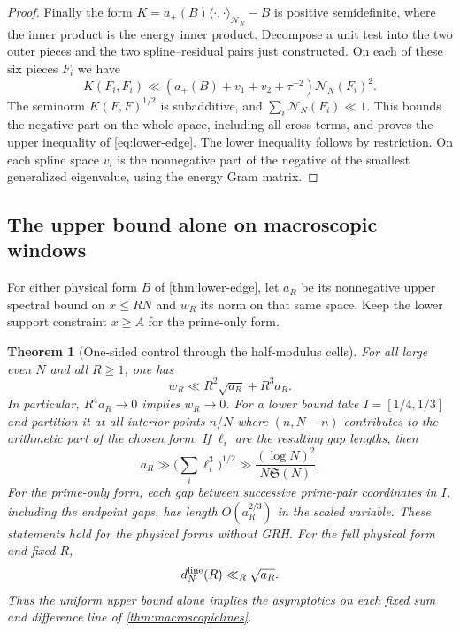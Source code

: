 \documentclass[11pt,a4paper]{article}
\numberwithin{equation}{section}
\newtheorem{theorem}{Theorem}[section]
\newcommand{\SSS}{\mathfrak S}
\newcommand{\NN}{\mathcal N_N}
\begin{document}
\begin{proof}
Finally the form $K=a_+(B)\langle\cdot,\cdot\rangle_{\NN}-B$
is positive semidefinite, where the inner product is the energy
inner product. Decompose a unit test into the two outer pieces
and the two spline--residual pairs just constructed. On each
of these six pieces $F_i$ we have
\[
 K(F_i,F_i)\ll
 (a_+(B)+v_1+v_2+\tau^{-2})\NN(F_i)^2 .
\]
The seminorm $K(F,F)^{1/2}$ is subadditive, and
$\sum_i\NN(F_i)\ll1$. This bounds the negative part on the
whole space, including all cross terms, and proves the upper
inequality of \cref{eq:lower-edge}. The lower inequality follows
by restriction. On each spline space $v_i$ is the nonnegative
part of the negative of the smallest generalized eigenvalue,
using the energy Gram matrix.
\end{proof}

\subsection{The upper bound alone on macroscopic windows}

For either physical form $B$ of \cref{thm:lower-edge}, let
$a_R$ be its nonnegative upper spectral bound on $x\le RN$
and $w_R$ its norm on that same space. Keep the lower support
constraint $x\ge A$ for the prime-only form.

\begin{theorem}[One-sided control through the half-modulus cells]
\label{thm:halfcell-upper}
For all large even $N$ and all $R\ge1$, one has
\begin{equation}
 w_R\ll R^2\sqrt{a_R}+R^3a_R .
 \label{eq:halfcell-upper}
\end{equation}
In particular, $R^4a_R\to0$ implies $w_R\to0$. For a lower bound
take $I=[1/4,1/3]$ and partition it at all interior points $n/N$
where $(n,N-n)$ contributes to the arithmetic part of the chosen
form. If $\ell_i$ are the resulting gap lengths, then
\begin{equation}
 a_R\gg \Big(\sum_i\ell_i^3\Big)^{1/2}
       \gg \frac{(\log N)^2}{N\SSS(N)} .
 \label{eq:halfcell-gap}
\end{equation}
For the prime-only form, each gap between successive prime-pair
coordinates in $I$, including the endpoint gaps, has length
$O(a_R^{2/3})$ in the scaled variable.
These statements hold for the physical forms without GRH.
For the full physical form and fixed $R$,
\[
 d_N^{\rm line}(R)\ll_R\sqrt{a_R}.
\]
Thus the uniform upper bound alone implies the asymptotics on
each fixed sum and difference line of \cref{thm:macroscopiclines}.
\end{theorem}
\end{document}
